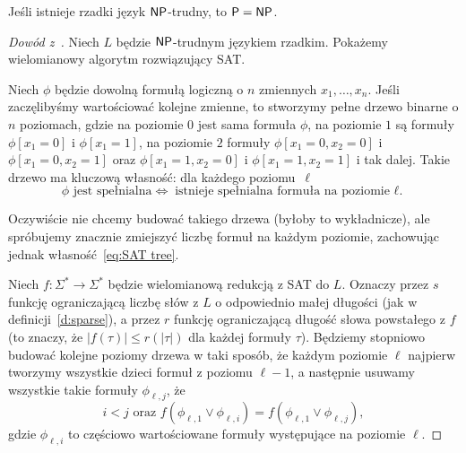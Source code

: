 \begin{theorem}[Mahaneya]\label{t:Mahaney}
    Jeśli istnieje rzadki język $\textsf{NP}$-trudny, to $\textsf{P} = \textsf{NP}$.
\end{theorem}
\begin{proof}[Dowód z~\cite{Grochow}]
    Niech $L$ będzie $\textsf{NP}$-trudnym językiem rzadkim. Pokażemy wielomianowy algorytm rozwiązujący SAT.

    Niech $\phi$ będzie dowolną formułą logiczną o $n$ zmiennych $x_1, \ldots, x_n$. Jeśli zaczęlibyśmy wartościować kolejne zmienne, to stworzymy pełne drzewo binarne o $n$ poziomach, gdzie na poziomie $0$ jest sama formuła $\phi$, na poziomie $1$ są formuły $\phi[x_1 \!=\! 0]$ i $\phi[x_1 \!=\! 1]$, na poziomie $2$ formuły $\phi[x_1 \!=\! 0, x_2 \!=\! 0]$ i $\phi[x_1 \!=\! 0, x_2 \!=\! 1]$ oraz $\phi[x_1 \!=\! 1, x_2 \!=\! 0]$ i $\phi[x_1 \!=\! 1, x_2 \!=\! 1]$ i tak dalej. Takie drzewo ma kluczową własność: dla każdego poziomu~$\ell$
    \begin{equation}\label{eq:SAT tree}
        \phi \text{ jest spełnialna} \iff \text{istnieje spełnialna formuła na poziomie $\ell$.}
    \end{equation}

    Oczywiście nie chcemy budować takiego drzewa (byłoby to wykładnicze), ale spróbujemy znacznie zmiejszyć liczbę formuł na każdym poziomie, zachowując jednak własność~\ref{eq:SAT tree}.

    Niech $f : \Sigma^* \to \Sigma^*$ będzie wielomianową redukcją z SAT do $L$. Oznaczy przez $s$ funkcję ograniczającą liczbę słów z $L$ o odpowiednio małej długości (jak w definicji~\ref{d:sparse}), a przez $r$ funkcję ograniczającą długość słowa powstałego z $f$ (to znaczy, że $|f(\tau)| \leq r(|\tau|)$ dla każdej formuły $\tau$).
    Będziemy stopniowo budować kolejne poziomy drzewa w taki sposób, że każdym poziomie $\ell$ najpierw tworzymy wszystkie dzieci formuł z poziomu $\ell - 1$, a następnie usuwamy wszystkie takie formuły $\phi_{\ell, j}$, że
    \[ i < j \text{ oraz } f(\phi_{\ell, 1} \lor \phi_{\ell, i}) = f(\phi_{\ell, 1} \lor \phi_{\ell, j}), \]
    gdzie $\phi_{\ell, i}$ to częściowo wartościowane formuły występujące na poziomie $\ell$.


\end{proof}
